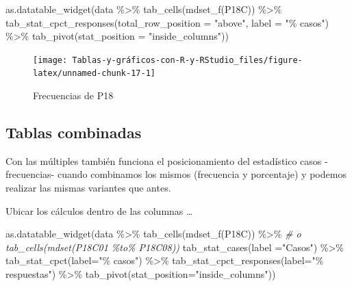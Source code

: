 \documentclass[
]{book}
\newenvironment{Shaded}{\begin{snugshade}}{\end{snugshade}}
\newcommand{\AttributeTok}[1]{\textcolor[rgb]{0.77,0.63,0.00}{#1}}
\newcommand{\CommentTok}[1]{\textcolor[rgb]{0.56,0.35,0.01}{\textit{#1}}}
\newcommand{\FunctionTok}[1]{\textcolor[rgb]{0.00,0.00,0.00}{#1}}
\newcommand{\NormalTok}[1]{#1}
\newcommand{\SpecialCharTok}[1]{\textcolor[rgb]{0.00,0.00,0.00}{#1}}
\newcommand{\StringTok}[1]{\textcolor[rgb]{0.31,0.60,0.02}{#1}}
\begin{document}
\begin{Shaded}
\begin{Highlighting}[]
\FunctionTok{as.datatable\_widget}\NormalTok{(data }\SpecialCharTok{\%\textgreater{}\%} \FunctionTok{tab\_cells}\NormalTok{(}\FunctionTok{mdset\_f}\NormalTok{(P18C)) }\SpecialCharTok{\%\textgreater{}\%} 
  \FunctionTok{tab\_stat\_cpct\_responses}\NormalTok{(}\AttributeTok{total\_row\_position =} \StringTok{"above"}\NormalTok{, }
    \AttributeTok{label =} \StringTok{"\% casos"}\NormalTok{) }\SpecialCharTok{\%\textgreater{}\%} \FunctionTok{tab\_pivot}\NormalTok{(}\AttributeTok{stat\_position =} \StringTok{"inside\_columns"}\NormalTok{))}
\end{Highlighting}
\end{Shaded}

\begin{figure}[H]

{\centering \texttt{[image: Tablas-y-gráficos-con-R-y-RStudio\_files/figure-latex/unnamed-chunk-17-1]} 

}

\caption{Frecuencias de P18}\label{fig:unnamed-chunk-17}
\end{figure}

\hypertarget{tablas-combinadas}{%
\subsection{Tablas combinadas}\label{tablas-combinadas}}

Con las múltiples también funciona el posicionamiento del estadístico casos -frecuencias- cuando combinamos los mismos (frecuencia y porcentaje) y podemos realizar las mismas variantes que antes.

Ubicar los cálculos dentro de las columnas \ldots{}

\begin{Shaded}
\begin{Highlighting}[]
\FunctionTok{as.datatable\_widget}\NormalTok{(data }\SpecialCharTok{\%\textgreater{}\%} 
  \FunctionTok{tab\_cells}\NormalTok{(}\FunctionTok{mdset\_f}\NormalTok{(P18C)) }\SpecialCharTok{\%\textgreater{}\%}  \CommentTok{\# o tab\_cells(mdset(P18C01 \%to\% P18C08))}
  \FunctionTok{tab\_stat\_cases}\NormalTok{(}\AttributeTok{label =}\StringTok{"Casos"}\NormalTok{) }\SpecialCharTok{\%\textgreater{}\%} 
  \FunctionTok{tab\_stat\_cpct}\NormalTok{(}\AttributeTok{label=}\StringTok{"\% casos"}\NormalTok{) }\SpecialCharTok{\%\textgreater{}\%} 
  \FunctionTok{tab\_stat\_cpct\_responses}\NormalTok{(}\AttributeTok{label=}\StringTok{"\% respuestas"}\NormalTok{) }\SpecialCharTok{\%\textgreater{}\%} 
  \FunctionTok{tab\_pivot}\NormalTok{(}\AttributeTok{stat\_position=}\StringTok{"inside\_columns"}\NormalTok{))}
\end{Highlighting}
\end{Shaded}
\end{document}
